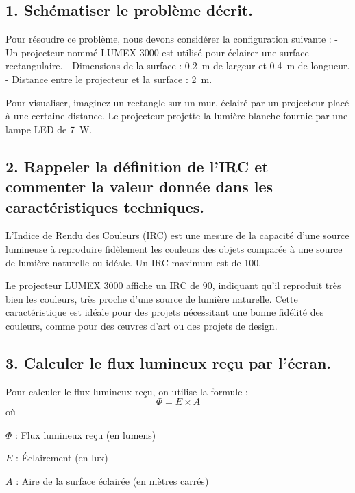\documentclass[answers]{exam}
\begin{document}
    \begin{solution}
\subsection*{1. Schématiser le problème décrit.}

\begin{questions}
Pour résoudre ce problème, nous devons considérer la configuration suivante :
- Un projecteur nommé LUMEX 3000 est utilisé pour éclairer une surface rectangulaire.
- Dimensions de la surface : \SI{0.2}{m} de largeur et \SI{0.4}{m} de longueur.
- Distance entre le projecteur et la surface : \SI{2}{m}.

Pour visualiser, imaginez un rectangle sur un mur, éclairé par un projecteur placé à une certaine distance. Le projecteur projette la lumière blanche fournie par une lampe LED de \SI{7}{W}.

\end{questions}

\subsection*{2. Rappeler la définition de l'IRC et commenter la valeur donnée dans les caractéristiques techniques.}

\begin{questions}
L'Indice de Rendu des Couleurs (IRC) est une mesure de la capacité d'une source lumineuse à reproduire fidèlement les couleurs des objets comparée à une source de lumière naturelle ou idéale. Un IRC maximum est de 100.

Le projecteur LUMEX 3000 affiche un IRC de 90, indiquant qu'il reproduit très bien les couleurs, très proche d'une source de lumière naturelle. Cette caractéristique est idéale pour des projets nécessitant une bonne fidélité des couleurs, comme pour des œuvres d'art ou des projets de design.

\end{questions}

\subsection*{3. Calculer le flux lumineux reçu par l'écran.}

Pour calculer le flux lumineux reçu, on utilise la formule :
\[
\Phi = E \times A
\]
où
\begin{addmargin}[4em]{1em}
\begin{compactitem}
    \item [\(\Phi\)]: Flux lumineux reçu (en lumens)
    \item [\(E\)]: Éclairement (en lux)
    \item [\(A\)]: Aire de la surface éclairée (en mètres carrés)
\end{compactitem}
\end{addmargin}


\end{solution}
\end{document}
